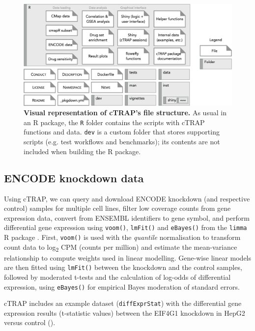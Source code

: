\begin{figure}[!ht]
  \includegraphics[width=1\textwidth]{images/ctrap/file-structure}
  \centering
  \caption[cTRAP file structure]{\textbf{Visual representation of cTRAP's file structure.} As usual in an R package, the \texttt{R} folder contains the scripts with cTRAP functions and data. \texttt{dev} is a custom folder that stores supporting scripts (e.g. test workflows and benchmarks); its contents are not included when building the R package.}
  \label{fig:ctrap-file-structure}
\end{figure}

\subsection{ENCODE knockdown data}

Using cTRAP, we can query and download ENCODE knockdown (and respective control) samples \cite{luo:2019tp} for multiple cell lines, filter low coverage counts from gene expression data, convert from ENSEMBL identifiers to gene symbol, and perform differential gene expression using \texttt{voom()}, \texttt{lmFit()} and \texttt{eBayes()} from the \texttt{limma} R package \cite{ritchie:2015tm}. First, \texttt{voom()} is used with the \emph{quantile} normalisation to transform count data to log\textsubscript{2} CPM (counts per million) and estimate the mean-variance relationship to compute weights used in linear modelling. Gene-wise linear models are then fitted using \texttt{lmFit()} between the knockdown and the control samples, followed by moderated t-tests and the calculation of log-odds of differential expression, using \texttt{eBayes()} for empirical Bayes moderation of standard errors.

cTRAP includes an example dataset (\texttt{diffExprStat}) with the differential gene expression results (t-statistic values) between the EIF4G1 knockdown in HepG2 versus control ().

